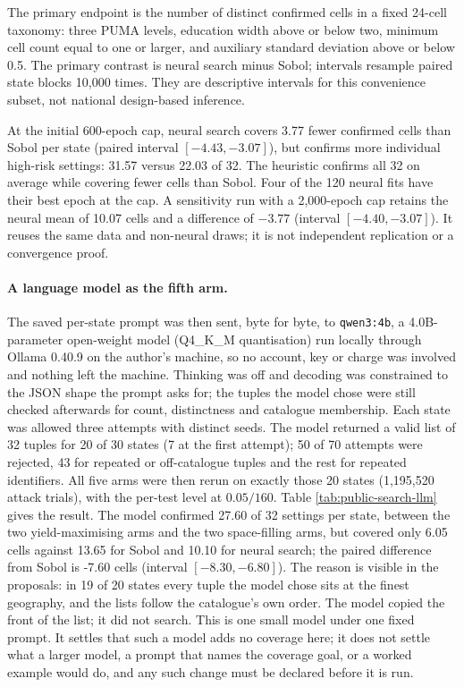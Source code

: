 The primary endpoint is the number of distinct confirmed cells in a fixed
24-cell taxonomy: three PUMA levels, education width above or below two,
minimum cell count equal to one or larger, and auxiliary standard deviation
above or below 0.5. The primary contrast is neural search minus Sobol;
intervals resample paired state blocks 10,000 times. They are descriptive
intervals for this convenience subset, not national design-based inference.



At the initial 600-epoch cap, neural search covers 3.77 fewer confirmed cells
than Sobol per state (paired interval $[-4.43,-3.07]$), but confirms more
individual high-risk settings: 31.57 versus 22.03 of 32. The heuristic
confirms all 32 on average while covering fewer cells than Sobol. Four of
the 120 neural fits have their best epoch at the cap. A sensitivity run with
a 2,000-epoch cap retains the neural mean of 10.07 cells and a difference of
$-3.77$ (interval $[-4.40,-3.07]$). It reuses the same data and non-neural
draws; it is not independent replication or a convergence proof.

\paragraph{A language model as the fifth arm.} The saved per-state prompt
was then sent, byte for byte, to \texttt{qwen3:4b}, a 4.0B-parameter
open-weight model (Q4\_K\_M quantisation) run locally through Ollama
0.40.9 on the author's machine, so no account, key or charge was
involved and nothing left the machine. Thinking was off and decoding was
constrained to the JSON shape the prompt asks for; the tuples the model chose
were still checked afterwards for count, distinctness and catalogue membership.
Each state was allowed three attempts with distinct seeds. The model returned a
valid list of 32 tuples for 20 of 30 states
(7 at the first attempt); 50 of
70 attempts were rejected, 43
for repeated or off-catalogue tuples and the rest for repeated identifiers. All
five arms were then rerun on exactly those 20 states
(1,195,520 attack trials), with the per-test level at $0.05/160$.
Table \ref{tab:public-search-llm} gives the result. The model confirmed
27.60 of 32 settings per state, between the two
yield-maximising arms and the two space-filling arms, but covered only
6.05 cells against 13.65 for Sobol and
10.10 for neural search; the paired difference from Sobol is
-7.60 cells (interval $[-8.30,-6.80]$).
The reason is visible in the proposals: in 19 of
20 states every tuple the model chose sits at the finest
geography, and the lists follow the catalogue's own order. The model copied the
front of the list; it did not search. This is one small model under one fixed
prompt. It settles that such a model adds no coverage here; it does not settle
what a larger model, a prompt that names the coverage goal, or a worked example
would do, and any such change must be declared before it is run.

